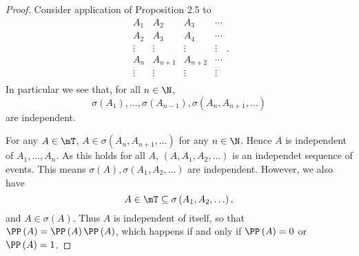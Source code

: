 \documentclass[stat901]{subfiles}
\begin{document}
    \begin{proof}
        Consider application of Proposition 2.5 to
        \begin{equation*}
            \begin{matrix}
            	A_1 & A_2 & A_3 & \cdots \\
            	A_2 & A_3 & A_4 & \cdots \\
            	\vdots & \vdots & \vdots & \vdots \\
                A_n & A_{n+1} & A_{n+2} & \cdots \\
            	\vdots & \vdots & \vdots & \vdots \\
            \end{matrix} .
        \end{equation*}
        In particular we see that, for all $n\in\N$,
        \begin{equation*}
            \sigma\left( A_1 \right), \ldots, \sigma\left( A_{n-1} \right), \sigma\left( A_n,A_{n+1},\ldots \right)
        \end{equation*}
        are independent. 

        For any $A\in\mT$, $A\in\sigma\left( A_n,A_{n+1},\ldots \right)$ for any $n\in\N$. Hence $A$ is independent of $A_1,\ldots,A_n$. As this holds for all $A$, $\left( A,A_1,A_2,\ldots \right)$ is an independet sequence of events. This means $\sigma\left( A \right), \sigma\left( A_1,A_2,\ldots \right)$ are independent. However, we also have
        \begin{equation*}
            A\in\mT\subseteq\sigma\left( A_1,A_2,\ldots \right),
        \end{equation*}
        and $A\in\sigma\left( A \right)$. Thus $A$ is independent of itself, so that $\PP\left( A \right) = \PP\left( A \right)\PP\left( A \right)$, which happens if and only if $\PP\left( A \right) = 0$ or $\PP\left( A \right) = 1$.
    \end{proof}
        
        
        
        
    
    
    
    
    
    
    
    
    
    
    
    
    
    
    
    
    
    
    
    
    
    
    
    
    
    
\end{document}
